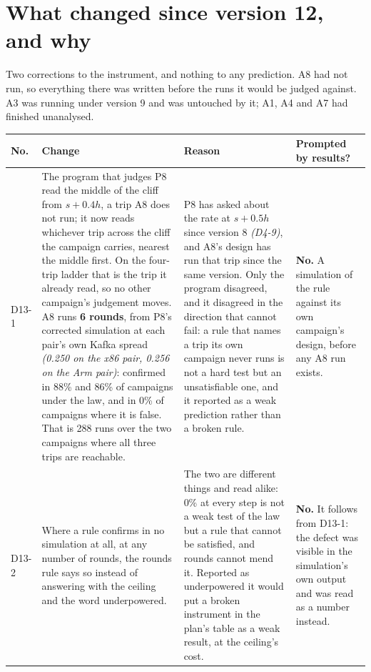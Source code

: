 \documentclass[11pt]{article}
\newcommand{\gl}[1]{{\color{soft}\itshape\small (#1)}}
\begin{document}
\section*{What changed since version 12, and why}
Two corrections to the instrument, and nothing to any prediction. A8 had not run, so everything there was written before the runs it would be judged against. A3 was running under version 9 and was untouched by it; A1, A4 and A7 had finished unanalysed.

{\small
\begin{longtable}{@{}p{1.1cm} >{\raggedright\arraybackslash}p{6.1cm} >{\raggedright\arraybackslash}p{6.0cm} >{\raggedright\arraybackslash}p{2.2cm}@{}}
\toprule
\textbf{No.} & \textbf{Change} & \textbf{Reason} & \textbf{Prompted by results?} \\
\midrule
\endhead
D13-1 & The program that judges P8 read the middle of the cliff from $s + 0.4h$, a trip A8 does not run; it now reads whichever trip across the cliff the campaign carries, nearest the middle first. On the four-trip ladder that is the trip it already read, so no other campaign's judgement moves. A8 runs \textbf{6 rounds}, from P8's corrected simulation at each pair's own Kafka spread \gl{0.250 on the x86 pair, 0.256 on the Arm pair}: confirmed in 88\% and 86\% of campaigns under the law, and in 0\% of campaigns where it is false. That is 288 runs over the two campaigns where all three trips are reachable. & P8 has asked about the rate at $s + 0.5h$ since version 8 \gl{D4-9}, and A8's design has run that trip since the same version. Only the program disagreed, and it disagreed in the direction that cannot fail: a rule that names a trip its own campaign never runs is not a hard test but an unsatisfiable one, and it reported as a weak prediction rather than a broken rule. & \textbf{No.} A simulation of the rule against its own campaign's design, before any A8 run exists. \\
D13-2 & Where a rule confirms in no simulation at all, at any number of rounds, the rounds rule says so instead of answering with the ceiling and the word underpowered. & The two are different things and read alike: 0\% at every step is not a weak test of the law but a rule that cannot be satisfied, and rounds cannot mend it. Reported as underpowered it would put a broken instrument in the plan's table as a weak result, at the ceiling's cost. & \textbf{No.} It follows from D13-1: the defect was visible in the simulation's own output and was read as a number instead. \\

\end{longtable}}
\end{document}
